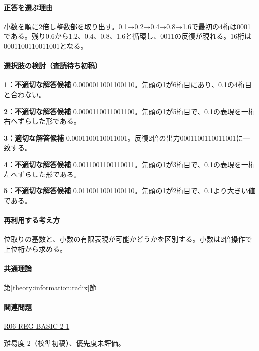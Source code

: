 \paragraph{正答を選ぶ理由} 小数を順に2倍し整数部を取り出す。0.1→0.2→0.4→0.8→1.6で最初の4桁は0001である。残り0.6から1.2、0.4、0.8、1.6と循環し、0011の反復が現れる。16桁は0001100110011001となる。

\paragraph{選択肢の検討（査読待ち初稿）}\mbox{}\par

\noindent\textbf{1：不適切な解答候補} 0.0000011001100110。先頭の1が6桁目にあり、0.1の4桁目と合わない。\par

\noindent\textbf{2：不適切な解答候補} 0.0000110011001100。先頭の1が5桁目で、0.1の表現を一桁右へずらした形である。\par

\noindent\textbf{3：適切な解答候補} 0.0001100110011001。反復2倍の出力0001100110011001に一致する。\par

\noindent\textbf{4：不適切な解答候補} 0.0011001100110011。先頭の1が3桁目で、0.1の表現を一桁左へずらした形である。\par

\noindent\textbf{5：不適切な解答候補} 0.0110011001100110。先頭の1が2桁目で、0.1より大きい値である。\par

\paragraph{再利用する考え方} 位取りの基数と、小数の有限表現が可能かどうかを区別する。小数は2倍操作で上位桁から求める。

\paragraph{共通理論} \hyperref[theory:information:radix]{第\ref*{theory:information:radix}節}

\paragraph{関連問題} \hyperref[q:r06-reg-basic-2-1]{R06-REG-BASIC-2-1}

\par 難易度 2（校準初稿）、優先度未評価。


